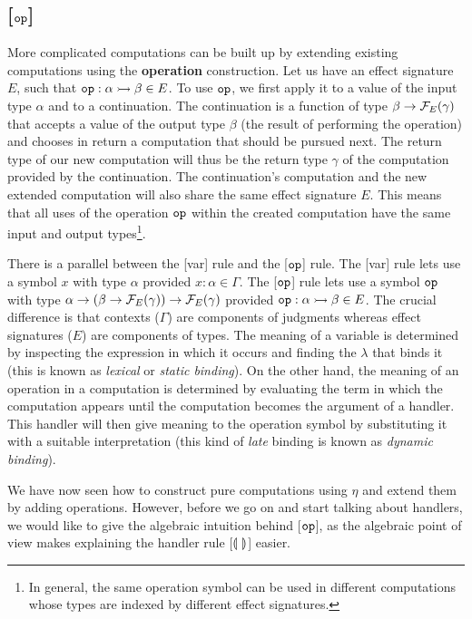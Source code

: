 \subsection*{[$\mathtt{op}$]}

More complicated computations can be built up by extending existing
computations using the \textbf{operation} construction. Let us have an
effect signature $E$, such that $\mathtt{op} : \alpha \rightarrowtail \beta \in E$. To use
$\mathtt{op}$, we first apply it to a value of the input type $\alpha$ and to a
continuation. The continuation is a function of type $\beta \to
\mathcal{F}_E(\gamma)$ that accepts a value of the output type $\beta$ (the result
of performing the operation) and chooses in return a computation that
should be pursued next. The return type of our new computation will thus be
the return type $\gamma$ of the computation provided by the
continuation. The continuation's computation and the new extended
computation will also share the same effect signature $E$. This means that
all uses of the operation $\mathtt{op}$ within the created computation have the
same input and output types\footnote{In general, the same operation symbol
  can be used in different computations whose types are indexed by
  different effect signatures.}.

There is a parallel between the [var] rule and the [$\mathtt{op}$] rule. The
[var] rule lets use a symbol $x$ with type $\alpha$ provided
$x : \alpha \in \Gamma$. The [$\mathtt{op}$] rule lets use a symbol $\mathtt{op}$
with type $\alpha \to (\beta \to \mathcal{F}_E(\gamma)) \to \mathcal{F}_E(\gamma)$ provided
$\mathtt{op} : \alpha \rightarrowtail \beta \in E$. The crucial difference is that
contexts ($\Gamma$) are components of judgments whereas effect signatures
($E$) are components of types. The meaning of a variable is determined by
inspecting the expression in which it occurs and finding the $\lambda$ that
binds it (this is known as \emph{lexical} or \emph{static binding}). On the
other hand, the meaning of an operation in a computation is determined by
evaluating the term in which the computation appears until the computation
becomes the argument of a handler. This handler will then give meaning to
the operation symbol by substituting it with a suitable interpretation
(this kind of \emph{late} binding is known as \emph{dynamic binding}).

We have now seen how to construct pure computations using $\eta$ and extend
them by adding operations. However, before we go on and start talking about
handlers, we would like to give the algebraic intuition behind [$\mathtt{op}$],
as the algebraic point of view makes explaining the handler rule
[$\llparenthesis \,  \, \rrparenthesis$] easier.

